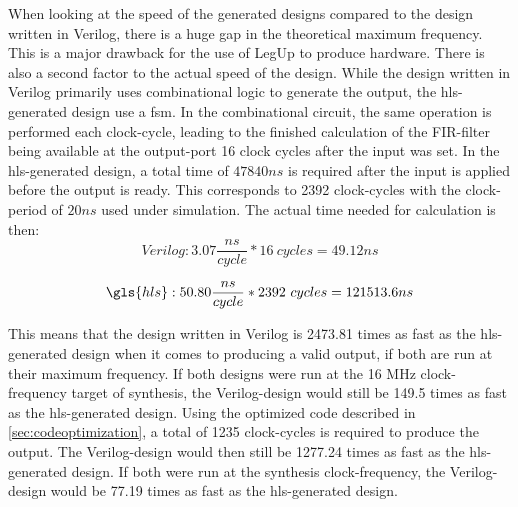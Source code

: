 When looking at the speed of the generated designs compared to the design written in Verilog, there is a huge gap in the theoretical maximum frequency. This is a major drawback for the use of LegUp to produce hardware. There is also a second factor to the actual speed of the design. While the design written in Verilog primarily uses combinational logic to generate the output, the \gls{hls}-generated design use a \gls{fsm}. In the combinational circuit, the same operation is performed each clock-cycle, leading to the finished calculation of the FIR-filter being available at the output-port 16 clock cycles after the input was set. In the \gls{hls}-generated design, a total time of $47840ns$ is required after the input is applied before the output is ready. This corresponds to 2392 clock-cycles with the clock-period of $20ns$ used under simulation. The actual time needed for calculation is then:
\begin{equation*}
    Verilog: 3.07\frac{ns}{cycle}*16~cycles = 49.12ns
\end{equation*}

\begin{equation*}
    \gls{hls}: 50.80\frac{ns}{cycle}*2392~cycles = 121513.6ns
\end{equation*}

This means that the design written in Verilog is 2473.81 times as fast as the \gls{hls}-generated design when it comes to producing a valid output, if both are run at their maximum frequency. If both designs were run at the 16 MHz clock-frequency target of synthesis, the Verilog-design would still be 149.5 times as fast as the \gls{hls}-generated design. Using the optimized code described in \cref{sec:codeoptimization}, a total of 1235 clock-cycles is required to produce the output. The Verilog-design would then still be 1277.24 times as fast as the \gls{hls}-generated design. If both were run at the synthesis clock-frequency, the Verilog-design would be 77.19 times as fast as the \gls{hls}-generated design.

